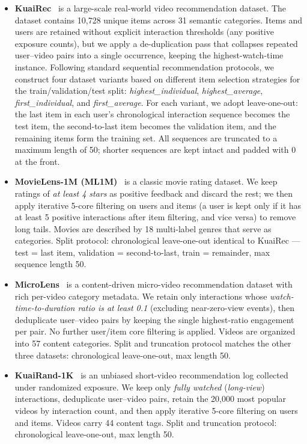 \begin{itemize}
    \item \textbf{KuaiRec}~\cite{gao2022kuairec} is a large-scale real-world video recommendation dataset. The dataset contains 10,728 unique items across 31 semantic categories. Items and users are retained without explicit interaction thresholds (any positive exposure counts), but we apply a de-duplication pass that collapses repeated user--video pairs into a single occurrence, keeping the highest-watch-time instance. Following standard sequential recommendation protocols, we construct four dataset variants based on different item selection strategies for the train/validation/test split: \emph{highest\_individual}, \emph{highest\_average}, \emph{first\_individual}, and \emph{first\_average}. For each variant, we adopt leave-one-out: the last item in each user's chronological interaction sequence becomes the test item, the second-to-last item becomes the validation item, and the remaining items form the training set. All sequences are truncated to a maximum length of 50; shorter sequences are kept intact and padded with $0$ at the front.
    \item \textbf{MovieLens-1M (ML1M)}~\cite{harper2015} is a classic movie rating dataset. We keep ratings of \emph{at least 4 stars} as positive feedback and discard the rest; we then apply iterative 5-core filtering on users and items (a user is kept only if it has at least 5 positive interactions after item filtering, and vice versa) to remove long tails. Movies are described by 18 multi-label genres that serve as categories. Split protocol: chronological leave-one-out identical to KuaiRec — test = last item, validation = second-to-last, train = remainder, max sequence length 50.
    \item \textbf{MicroLens}~\cite{ni2023microlens} is a content-driven micro-video recommendation dataset with rich per-video category metadata. We retain only interactions whose \emph{watch-time-to-duration ratio is at least 0.1} (excluding near-zero-view events), then deduplicate user--video pairs by keeping the single highest-ratio engagement per pair. No further user/item core filtering is applied. Videos are organized into 57 content categories. Split and truncation protocol matches the other three datasets: chronological leave-one-out, max length 50.
    \item \textbf{KuaiRand-1K}~\cite{gao2022kuairand} is an unbiased short-video recommendation log collected under randomized exposure. We keep only \emph{fully watched} (\emph{long-view}) interactions, deduplicate user--video pairs, retain the 20{,}000 most popular videos by interaction count, and then apply iterative 5-core filtering on users and items. Videos carry 44 content tags. Split and truncation protocol: chronological leave-one-out, max length 50.
\end{itemize}

